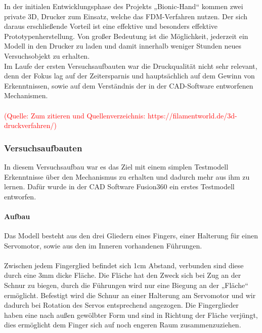 \documentclass[titlepage,12pt,twoside]{article}
\begin{document}
In der initialen Entwicklungsphase des Projekts „Bionic-Hand“ kommen zwei private 3D, 
Drucker zum Einsatz, welche das FDM-Verfahren nutzen. Der sich daraus erschließende 
Vorteil ist eine effektive und besonders effektive Prototypenherstellung. Von großer 
Bedeutung ist die Möglichkeit, jederzeit ein Modell in den Drucker zu laden und damit 
innerhalb weniger Stunden neues Versuchsobjekt zu erhalten. \\
Im Laufe der ersten Versuchsaufbauten war die Druckqualität nicht sehr relevant, denn 
der Fokus lag auf der Zeitersparnis und hauptsächlich auf dem Gewinn von Erkenntnissen, 
sowie auf dem Verständnis der in der CAD-Software entworfenen Mechanismen. \\
\\
\textcolor{red}{(Quelle: Zum zitieren und Quellenverzeichnis: https://filamentworld.de/3d-druckverfahren/)}

\subsubsection{Versuchsaufbauten}
In diesem Versuchsaufbau war es das Ziel mit einem simplen Testmodell Erkenntnisse über 
den Mechanismus zu erhalten und dadurch mehr aus ihm zu lernen. 
Dafür wurde in der CAD Software Fusion360 ein erstes Testmodell entworfen. \\

\paragraph{Aufbau}
\hfill \break
\hfill \break
Das Modell besteht aus den drei Gliedern eines Fingers, einer Halterung für einen 
Servomotor, sowie aus den im Inneren vorhandenen Führungen. \\
\\
Zwischen jedem Fingerglied befindet sich 1cm Abstand, verbunden sind diese durch eine 
3mm dicke Fläche. Die Fläche hat den Zweck sich bei Zug an der Schnur zu biegen, durch 
die Führungen wird nur eine Biegung an der „Fläche“ ermöglicht. Befestigt wird die
Schnur an einer Halterung am Servomotor und wir dadurch bei Rotation des Servos 
entsprechend angezogen. Die Fingerglieder haben eine nach außen gewölbter Form und sind 
in Richtung der Fläche verjüngt, dies ermöglicht dem Finger sich auf noch engeren Raum 
zusammenzuziehen.
\end{document}
